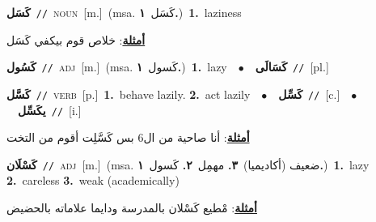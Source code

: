 \documentclass[10pt,a4paper,twoside]{article} %
\begin{document}
\begin{multicols}{2}
{\setlength\topsep{0pt}\textbf{\foreignlanguage{arabic}{كَسَل}}\ {\color{gray}\texttt{//}\color{black}}\ \textsc{noun}\ [m.]\ \color{gray}(msa. \foreignlanguage{arabic}{كَسَل}~\foreignlanguage{arabic}{\textbf{١.}})\color{black}\ \textbf{1.}~laziness\  \begin{flushright}\color{gray}\foreignlanguage{arabic}{\textbf{\underline{\foreignlanguage{arabic}{أمثلة}}}: خلاص قوم بيكفي كَسَل}\end{flushright}\color{black}} \vspace{2mm}

{\setlength\topsep{0pt}\textbf{\foreignlanguage{arabic}{كَسُول}}\ {\color{gray}\texttt{//}\color{black}}\ \textsc{adj}\ [m.]\ \color{gray}(msa. \foreignlanguage{arabic}{كَسول}~\foreignlanguage{arabic}{\textbf{١.}})\color{black}\ \textbf{1.}~lazy\ \ $\bullet$\ \ \setlength\topsep{0pt}\textbf{\foreignlanguage{arabic}{كَسَالَى}}\ {\color{gray}\texttt{//}\color{black}}\ [pl.]\ } \vspace{2mm}

{\setlength\topsep{0pt}\textbf{\foreignlanguage{arabic}{كَسَّل}}\ {\color{gray}\texttt{//}\color{black}}\ \textsc{verb}\ [p.]\ \textbf{1.}~behave lazily.  \textbf{2.}~act lazily\ \ $\bullet$\ \ \setlength\topsep{0pt}\textbf{\foreignlanguage{arabic}{كَسِّل}}\ {\color{gray}\texttt{//}\color{black}}\ [c.]\ \ $\bullet$\ \ \setlength\topsep{0pt}\textbf{\foreignlanguage{arabic}{يكَسِّل}}\ {\color{gray}\texttt{//}\color{black}}\ [i.]\  \begin{flushright}\color{gray}\foreignlanguage{arabic}{\textbf{\underline{\foreignlanguage{arabic}{أمثلة}}}: أنا صاحية من ال6 بس كَسَّلِت أقوم من التخت}\end{flushright}\color{black}} \vspace{2mm}

{\setlength\topsep{0pt}\textbf{\foreignlanguage{arabic}{كَسْلَان}}\ {\color{gray}\texttt{//}\color{black}}\ \textsc{adj}\ [m.]\ \color{gray}(msa. \foreignlanguage{arabic}{ضعيف (أكاديميا)}~\foreignlanguage{arabic}{\textbf{٣.}}  \foreignlanguage{arabic}{مهمِل}~\foreignlanguage{arabic}{\textbf{٢.}}  \foreignlanguage{arabic}{كَسول}~\foreignlanguage{arabic}{\textbf{١.}})\color{black}\ \textbf{1.}~lazy  \textbf{2.}~careless  \textbf{3.}~weak (academically)\  \begin{flushright}\color{gray}\foreignlanguage{arabic}{\textbf{\underline{\foreignlanguage{arabic}{أمثلة}}}: مْطيع كَسْلان بالمدرسة ودايما علاماته بالحضيض}\end{flushright}\color{black}} \vspace{2mm}


\end{multicols}
\end{document}
